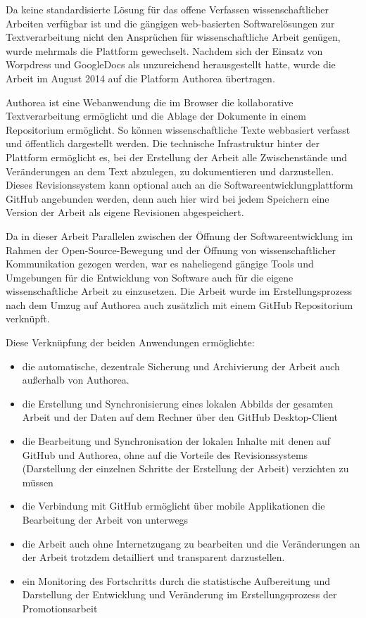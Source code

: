Da keine standardisierte Lösung für das offene Verfassen wissenschaftlicher Arbeiten verfügbar ist und die gängigen web-basierten Softwarelösungen zur Textverarbeitung nicht den Ansprüchen für wissenschaftliche Arbeit genügen, wurde mehrmals die Plattform gewechselt. Nachdem sich der Einsatz von Worpdress und GoogleDocs als unzureichend herausgestellt hatte, wurde die Arbeit im August 2014 auf die Platform Authorea übertragen.

Authorea ist eine Webanwendung die im Browser die kollaborative Textverarbeitung ermöglicht und die Ablage der Dokumente in einem Repositorium ermöglicht. So können wissenschaftliche Texte webbasiert verfasst und öffentlich dargestellt werden. Die technische Infrastruktur hinter der Plattform ermöglicht es, bei der Erstellung der Arbeit alle Zwischenstände und Veränderungen an dem Text abzulegen, zu dokumentieren und darzustellen. Dieses Revisionssystem kann optional auch an die Softwareentwicklungplattform GitHub angebunden werden, denn auch hier wird bei jedem Speichern eine Version der Arbeit als eigene Revisionen abgespeichert.

Da in dieser Arbeit Parallelen zwischen der Öffnung der Softwareentwicklung im Rahmen der Open-Source-Bewegung und der Öffnung von wissenschaftlicher Kommunikation gezogen werden, war es naheliegend gängige Tools und Umgebungen für die Entwicklung von Software auch für die eigene wissenschaftliche Arbeit zu einzusetzen. Die Arbeit wurde im Erstellungsprozess nach dem Umzug auf Authorea auch zusätzlich mit einem GitHub Repositorium verknüpft.

Diese Verknüpfung der beiden Anwendungen ermöglichte:
\begin{itemize}
\item die automatische, dezentrale Sicherung und Archivierung der Arbeit auch außerhalb von Authorea.
\item die Erstellung und Synchronisierung eines lokalen Abbilds der gesamten Arbeit und der Daten auf dem Rechner über den GitHub Desktop-Client
\item die Bearbeitung und Synchronisation der lokalen Inhalte mit denen auf GitHub und Authorea, ohne auf die Vorteile des Revisionssystems (Darstellung der einzelnen Schritte der Erstellung der Arbeit) verzichten zu müssen
\item die Verbindung mit GitHub ermöglicht über mobile Applikationen die Bearbeitung der Arbeit von unterwegs
\item die Arbeit auch ohne Internetzugang zu bearbeiten und die Veränderungen an der Arbeit trotzdem detailliert und transparent darzustellen.
\item ein Monitoring des Fortschritts durch die statistische Aufbereitung und Darstellung der Entwicklung und Veränderung im Erstellungsprozess der Promotionsarbeit
\end{itemize}

